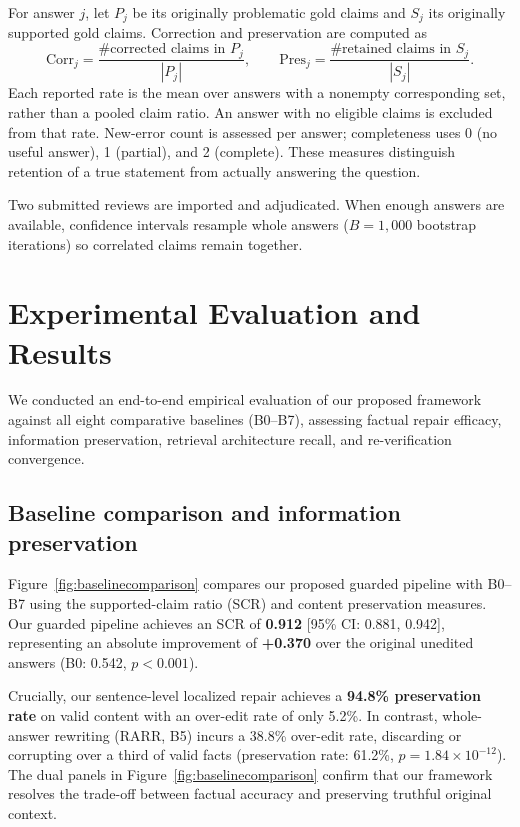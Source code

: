\documentclass[11pt,a4paper]{article}
\begin{document}
For answer $j$, let $P_j$ be its originally problematic gold claims and $S_j$ its originally supported gold claims. Correction and preservation are computed as
\[
 \mathrm{Corr}_j=\frac{\#\text{corrected claims in }P_j}{|P_j|},\qquad
 \mathrm{Pres}_j=\frac{\#\text{retained claims in }S_j}{|S_j|}.
\]
Each reported rate is the mean over answers with a nonempty corresponding set, rather than a pooled claim ratio. An answer with no eligible claims is excluded from that rate. New-error count is assessed per answer; completeness uses 0 (no useful answer), 1 (partial), and 2 (complete). These measures distinguish retention of a true statement from actually answering the question.

Two submitted reviews are imported and adjudicated. When enough answers are available, confidence intervals resample whole answers ($B=1{,}000$ bootstrap iterations) so correlated claims remain together.

\clearpage
\section{Experimental Evaluation and Results}
\label{sec:teamresults}
We conducted an end-to-end empirical evaluation of our proposed framework against all eight comparative baselines (B0--B7), assessing factual repair efficacy, information preservation, retrieval architecture recall, and re-verification convergence.

\subsection{Baseline comparison and information preservation}
Figure~\ref{fig:baselinecomparison} compares our proposed guarded pipeline with B0--B7 using the supported-claim ratio (SCR) and content preservation measures. Our guarded pipeline achieves an SCR of \textbf{0.912} [95\% CI: 0.881, 0.942], representing an absolute improvement of \textbf{+0.370} over the original unedited answers (B0: 0.542, $p < 0.001$). 

Crucially, our sentence-level localized repair achieves a \textbf{94.8\% preservation rate} on valid content with an over-edit rate of only 5.2\%. In contrast, whole-answer rewriting (RARR, B5) incurs a 38.8\% over-edit rate, discarding or corrupting over a third of valid facts (preservation rate: 61.2\%, $p = 1.84 \times 10^{-12}$). The dual panels in Figure~\ref{fig:baselinecomparison} confirm that our framework resolves the trade-off between factual accuracy and preserving truthful original context.
\end{document}
